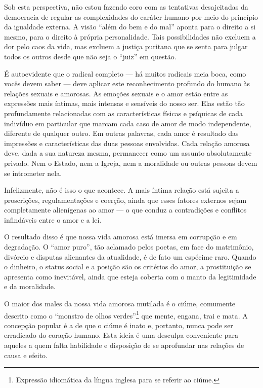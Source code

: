 Sob esta perspectiva, não estou fazendo coro com as tentativas desajeitadas da
democracia de regular as complexidades do caráter humano por meio do
princípio da igualdade externa. A visão ``além do bem e do mal'' aponta
para o direito a si mesmo, para o direito à própria personalidade. Tais
possibilidades não excluem a dor pelo caos da vida, mas excluem a
justiça puritana que se senta para julgar todos os outros desde que não
seja o ``juiz'' em questão.

É autoevidente que o radical completo --- há muitos radicais meia boca,
como vocês devem saber --- deve aplicar este reconhecimento profundo do
humano às relações sexuais e amorosas. As emoções sexuais e o amor estão
entre as expressões mais íntimas, mais intensas e sensíveis do nosso
ser. Elas estão tão profundamente relacionadas com as características
físicas e psíquicas de cada indivíduo em particular que marcam cada caso
de amor de modo independente, diferente de qualquer outro. Em outras
palavras, cada amor é resultado das impressões e características das
duas pessoas envolvidas. Cada relação amorosa deve, dada a sua natureza
mesma, permanecer como um assunto absolutamente privado. Nem o Estado,
nem a Igreja, nem a moralidade ou outras pessoas devem se intrometer nela.

Infelizmente, não é isso o que acontece. A mais íntima relação está
sujeita a proscrições, regulamentações e coerção, ainda que esses
fatores externos sejam completamente alienígenas ao amor --- o que conduz
a contradições e conflitos infindáveis entre o amor e a lei.

O resultado disso é que nossa vida amorosa está imersa em corrupção e em
degradação. O ``amor puro'', tão aclamado pelos poetas, em face do
matrimônio, divórcio e disputas alienantes da atualidade, é de fato um
espécime raro. Quando o dinheiro, o status social e a posição são os
critérios do amor, a prostituição se apresenta como inevitável, ainda
que esteja coberta com o manto da legitimidade e da moralidade.

O maior dos males da nossa vida amorosa mutilada é o ciúme, comumente
descrito como o ``monstro de olhos verdes''\footnote{Expressão
  idiomática da língua inglesa para se referir ao ciúme.} que mente,
engana, trai e mata. A concepção popular é a de que o ciúme é inato e,
portanto, nunca pode ser erradicado do coração humano. Esta ideia é uma
desculpa conveniente para aqueles a quem falta habilidade e disposição
de se aprofundar nas relações de causa e efeito.


